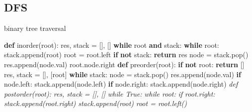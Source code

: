 \documentclass[
]{article}
\newenvironment{Shaded}{}{}
\newcommand{\CommentTok}[1]{\textcolor[rgb]{0.38,0.63,0.69}{\textit{#1}}}
\newcommand{\ControlFlowTok}[1]{\textcolor[rgb]{0.00,0.44,0.13}{\textbf{#1}}}
\newcommand{\KeywordTok}[1]{\textcolor[rgb]{0.00,0.44,0.13}{\textbf{#1}}}
\newcommand{\NormalTok}[1]{#1}
\newcommand{\OperatorTok}[1]{\textcolor[rgb]{0.40,0.40,0.40}{#1}}
\begin{document}
\hypertarget{dfs}{%
\subsection{DFS}\label{dfs}}

binary tree traversal

\begin{Shaded}
\begin{Highlighting}[]
\KeywordTok{def}\NormalTok{ inorder(root):}
\NormalTok{  res, stack }\OperatorTok{=}\NormalTok{ [], []}
  \ControlFlowTok{while}\NormalTok{ root }\KeywordTok{and}\NormalTok{ stack:}
    \ControlFlowTok{while}\NormalTok{ root:}
\NormalTok{      stack.append(root)}
\NormalTok{      root }\OperatorTok{=}\NormalTok{ root.left}
   	\ControlFlowTok{if} \KeywordTok{not}\NormalTok{ stack:}
      \ControlFlowTok{return}\NormalTok{ res}
\NormalTok{   	node }\OperatorTok{=}\NormalTok{ stack.pop()}
\NormalTok{    res.append(node.val)}
\NormalTok{    root.node.right}
\KeywordTok{def}\NormalTok{ preorder(root):}
  \ControlFlowTok{if} \KeywordTok{not}\NormalTok{ root: }\ControlFlowTok{return}\NormalTok{ []}
\NormalTok{  res, stack }\OperatorTok{=}\NormalTok{ [], [root]}
  \ControlFlowTok{while}\NormalTok{ stack:}
\NormalTok{    node }\OperatorTok{=}\NormalTok{ stack.pop()}
\NormalTok{    res.append(node.val)}
    \ControlFlowTok{if}\NormalTok{ node.left:}
\NormalTok{      stack.append(node.left)}
    \ControlFlowTok{if}\NormalTok{ node.right:}
\NormalTok{      stack.append(node.right)}
\CommentTok{\textquotesingle{}\textquotesingle{}\textquotesingle{}def postorder(root):}
\CommentTok{  res, stack = [], []}
\CommentTok{  while True:}
\CommentTok{    while root:}
\CommentTok{      if root.right:}
\CommentTok{        stack.append(root.right)}
\CommentTok{      stack.append(root)}
\CommentTok{      root = root.left()\textquotesingle{}\textquotesingle{}\textquotesingle{}}
\end{Highlighting}
\end{Shaded}
\end{document}
